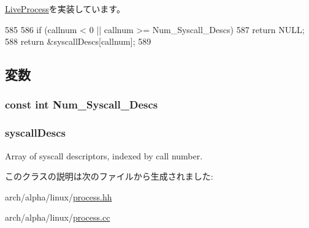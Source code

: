 \hyperlink{classLiveProcess_a478f396f8895ef7728d26866a00121d7}{LiveProcess}を実装しています。


\begin{DoxyCode}
585 {
586     if (callnum < 0 || callnum >= Num_Syscall_Descs)
587         return NULL;
588     return &syscallDescs[callnum];
589 }
\end{DoxyCode}


\subsection{変数}
\hypertarget{classAlphaISA_1_1AlphaLinuxProcess_a9534988905c6f5c8c57c4b6a7b179fea}{
\subsubsection[{Num\_\-Syscall\_\-Descs}]{\setlength{\rightskip}{0pt plus 5cm}const int {\bf Num\_\-Syscall\_\-Descs}}}
\label{classAlphaISA_1_1AlphaLinuxProcess_a9534988905c6f5c8c57c4b6a7b179fea}
\hypertarget{classAlphaISA_1_1AlphaLinuxProcess_a08d67a94820b75842e07f030e548372e}{
\subsubsection[{syscallDescs}]{ {\bf syscallDescs}}}
\label{classAlphaISA_1_1AlphaLinuxProcess_a08d67a94820b75842e07f030e548372e}


Array of syscall descriptors, indexed by call number. 

このクラスの説明は次のファイルから生成されました:\begin{DoxyCompactItemize}
\item 
arch/alpha/linux/\hyperlink{arch_2alpha_2linux_2process_8hh}{process.hh}\item 
arch/alpha/linux/\hyperlink{arch_2alpha_2linux_2process_8cc}{process.cc}\end{DoxyCompactItemize}
